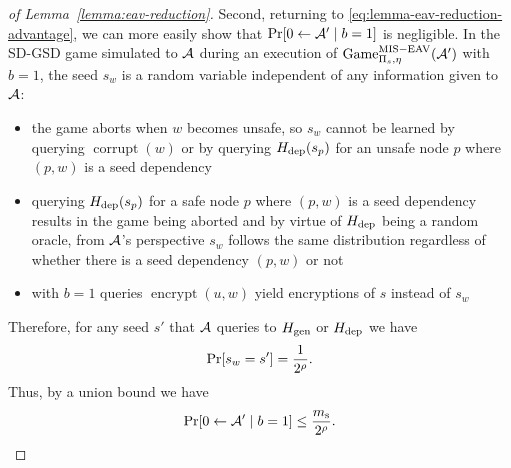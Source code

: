 \begin{proof}[of Lemma~\ref{lemma:eav-reduction}]
	Second, returning to \eqref{eq:lemma-eav-reduction-advantage}, we can more easily show that $\pr{0 \from \adv' \mid b = 1}$ is negligible. In the SD-GSD game simulated to $\mathcal{A}$ during an execution of $\mathrm{Game}_{\Pi_s, \eta}^{\mathrm{MIS-EAV}}(\mathcal{A}')$ with $b = 1$, the seed $s_w$ is a random variable independent of any information given to $\mathcal{A}$:
	\begin{itemize}
		\item the game aborts when $w$ becomes unsafe, so $s_w$ cannot be learned by querying $\operatorname{corrupt}(w)$ or by querying $H_\mathrm{dep}(s_p)$ for an unsafe node $p$ where $(p, w)$ is a seed dependency
		\item querying $H_\mathrm{dep}(s_p)$ for a safe node $p$ where $(p, w)$ is a seed dependency results in the game being aborted and by virtue of $H_\mathrm{dep}$ being a random oracle, from $\mathcal{A}$'s perspective $s_w$ follows the same distribution regardless of whether there is a seed dependency $(p, w)$ or not
		\item with $b = 1$ queries $\operatorname{encrypt}(u, w)$ yield encryptions of $s$ instead of $s_w$
	\end{itemize}
	Therefore, for any seed $s'$ that $\mathcal{A}$ queries to $H_\mathrm{gen}$ or $H_\mathrm{dep}$ we have
	\[
		\pr{s_w = s'} = \frac{1}{2^\rho}.
	\]
	Thus, by a union bound we have
	\begin{equation} \label{eq:lemma-eav-reduction-b=1}
		\pr{0 \from \adv' \mid b = 1} \le \frac{\ms}{2^\rho}.
	\end{equation}


\end{proof}
